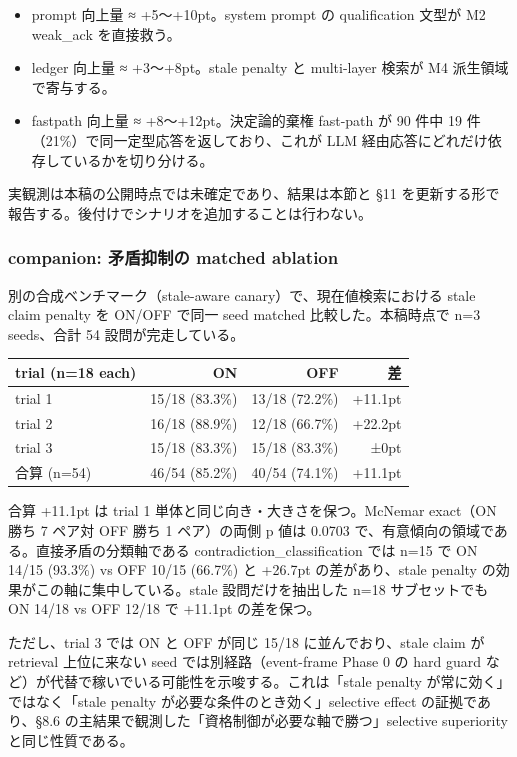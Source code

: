 \documentclass[12pt,a4paper]{article}
\begin{document}
\begin{itemize}
\tightlist
\item
  prompt 向上量 ≈ +5〜+10pt。system prompt の qualification 文型が M2 weak\_ack を直接救う。
\item
  ledger 向上量 ≈ +3〜+8pt。stale penalty と multi-layer 検索が M4 派生領域で寄与する。
\item
  fastpath 向上量 ≈ +8〜+12pt。決定論的棄権 fast-path が 90 件中 19 件（21\%）で同一定型応答を返しており、これが LLM 経由応答にどれだけ依存しているかを切り分ける。
\end{itemize}

実観測は本稿の公開時点では未確定であり、結果は本節と \S11 を更新する形で報告する。後付けでシナリオを追加することは行わない。

\subsubsection{companion: 矛盾抑制の matched ablation}

別の合成ベンチマーク（stale-aware canary）で、現在値検索における stale claim penalty を ON/OFF で同一 seed matched 比較した。本稿時点で n=3 seeds、合計 54 設問が完走している。

{\def\LTcaptype{table}
\begin{longtable}[]{@{}lrrr@{}}
\toprule\noalign{}
trial (n=18 each) & ON & OFF & 差 \\
\midrule\noalign{}
\endhead
\bottomrule\noalign{}
\endlastfoot
trial 1 & 15/18 (83.3\%) & 13/18 (72.2\%) & +11.1pt \\
trial 2 & 16/18 (88.9\%) & 12/18 (66.7\%) & +22.2pt \\
trial 3 & 15/18 (83.3\%) & 15/18 (83.3\%) & ±0pt \\
合算 (n=54) & 46/54 (85.2\%) & 40/54 (74.1\%) & +11.1pt \\
\end{longtable}
}

合算 +11.1pt は trial 1 単体と同じ向き・大きさを保つ。McNemar exact（ON 勝ち 7 ペア対 OFF 勝ち 1 ペア）の両側 p 値は 0.0703 で、有意傾向の領域である。直接矛盾の分類軸である contradiction\_classification では n=15 で ON 14/15 (93.3\%) vs OFF 10/15 (66.7\%) と +26.7pt の差があり、stale penalty の効果がこの軸に集中している。stale 設問だけを抽出した n=18 サブセットでも ON 14/18 vs OFF 12/18 で +11.1pt の差を保つ。

ただし、trial 3 では ON と OFF が同じ 15/18 に並んでおり、stale claim が retrieval 上位に来ない seed では別経路（event-frame Phase 0 の hard guard など）が代替で稼いでいる可能性を示唆する。これは「stale penalty が常に効く」ではなく「stale penalty が必要な条件のとき効く」selective effect の証拠であり、§8.6 の主結果で観測した「資格制御が必要な軸で勝つ」selective superiority と同じ性質である。
\end{document}
